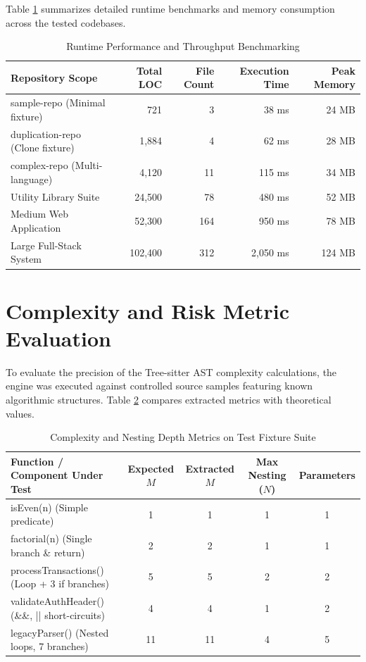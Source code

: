 Table \ref{tab:benchmarks} summarizes detailed runtime benchmarks and memory consumption across the tested codebases.

\begin{table}[htbp]
\centering
\footnotesize
\caption{Runtime Performance and Throughput Benchmarking}
\label{tab:benchmarks}
\vspace{0.15cm}
\renewcommand{\arraystretch}{1.2}
\begin{tabularx}{\textwidth}{@{}p{5.2cm}rrrr@{}}
\toprule
\textbf{Repository Scope} & \textbf{Total LOC} & \textbf{File Count} & \textbf{Execution Time} & \textbf{Peak Memory} \\
\midrule
sample-repo (Minimal fixture)     & 721     & 3   & 38 ms    & 24 MB  \\
duplication-repo (Clone fixture)  & 1,884   & 4   & 62 ms    & 28 MB  \\
complex-repo (Multi-language)     & 4,120   & 11  & 115 ms   & 34 MB  \\
Utility Library Suite             & 24,500  & 78  & 480 ms   & 52 MB  \\
Medium Web Application            & 52,300  & 164 & 950 ms   & 78 MB  \\
Large Full-Stack System           & 102,400 & 312 & 2,050 ms & 124 MB \\
\bottomrule
\end{tabularx}
\end{table}

\section{Complexity and Risk Metric Evaluation}
To evaluate the precision of the Tree-sitter AST complexity calculations, the engine was executed against controlled source samples featuring known algorithmic structures. Table \ref{tab:complexity_results} compares extracted metrics with theoretical values.

\begin{table}[htbp]
\centering
\small
\caption{Complexity and Nesting Depth Metrics on Test Fixture Suite}
\label{tab:complexity_results}
\vspace{0.15cm}
\renewcommand{\arraystretch}{1.15}
\begin{tabularx}{\textwidth}{>{\raggedright\arraybackslash}X c c c c}
\toprule
\textbf{Function / Component Under Test} & \textbf{Expected $M$} & \textbf{Extracted $M$} & \textbf{Max Nesting ($N$)} & \textbf{Parameters} \\
\midrule
isEven(n) (Simple predicate) & 1 & 1 & 1 & 1 \\
factorial(n) (Single branch \& return) & 2 & 2 & 1 & 1 \\
processTransactions() (Loop + 3 if branches) & 5 & 5 & 2 & 2 \\
validateAuthHeader() (\&\&, || short-circuits) & 4 & 4 & 1 & 2 \\
legacyParser() (Nested loops, 7 branches) & 11 & 11 & 4 & 5 \\
\bottomrule
\end{tabularx}
\end{table}

